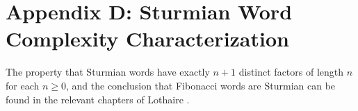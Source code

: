 \section{Appendix D: Sturmian Word Complexity Characterization}

The property that Sturmian words have exactly $n+1$ distinct factors of length $n$ for each $n\ge 0$, and the conclusion that Fibonacci words are Sturmian can be found in the relevant chapters of Lothaire \cite{CambridgeSturmianWordsLothaire}.
